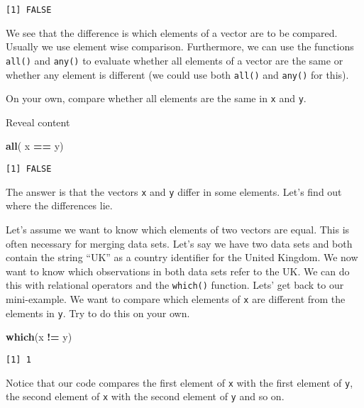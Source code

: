\documentclass[]{article}
\newenvironment{Shaded}{\begin{snugshade}}{\end{snugshade}}
\newcommand{\KeywordTok}[1]{\textcolor[rgb]{0.13,0.29,0.53}{\textbf{#1}}}
\newcommand{\NormalTok}[1]{#1}
\newcommand{\OperatorTok}[1]{\textcolor[rgb]{0.81,0.36,0.00}{\textbf{#1}}}
\newcommand{\StringTok}[1]{\textcolor[rgb]{0.31,0.60,0.02}{#1}}
\begin{document}
\begin{verbatim}
[1] FALSE
\end{verbatim}

We see that the difference is which elements of a vector are to be compared. Usually we use element wise comparison. Furthermore, we can use the functions \texttt{all()} and \texttt{any()} to evaluate whether all elements of a vector are the same or whether any element is different (we could use both \texttt{all()} and \texttt{any()} for this).

On your own, compare whether all elements are the same in \texttt{x} and \texttt{y}.

Reveal content

\begin{Shaded}
\begin{Highlighting}[]
\KeywordTok{all}\NormalTok{( x }\OperatorTok{==}\StringTok{ }\NormalTok{y)}
\end{Highlighting}
\end{Shaded}

\begin{verbatim}
[1] FALSE
\end{verbatim}

The answer is that the vectors \texttt{x} and \texttt{y} differ in some elements. Let's find out where the differences lie.

Let's assume we want to know which elements of two vectors are equal. This is often necessary for merging data sets. Let's say we have two data sets and both contain the string ``UK'' as a country identifier for the United Kingdom. We now want to know which observations in both data sets refer to the UK. We can do this with relational operators and the \texttt{which()} function. Lets' get back to our mini-example. We want to compare which elements of \texttt{x} are different from the elements in \texttt{y}. Try to do this on your own.

\begin{Shaded}
\begin{Highlighting}[]
\KeywordTok{which}\NormalTok{(x }\OperatorTok{!=}\StringTok{ }\NormalTok{y)}
\end{Highlighting}
\end{Shaded}

\begin{verbatim}
[1] 1
\end{verbatim}

Notice that our code compares the first element of \texttt{x} with the first element of \texttt{y}, the second element of \texttt{x} with the second element of \texttt{y} and so on.
\end{document}
